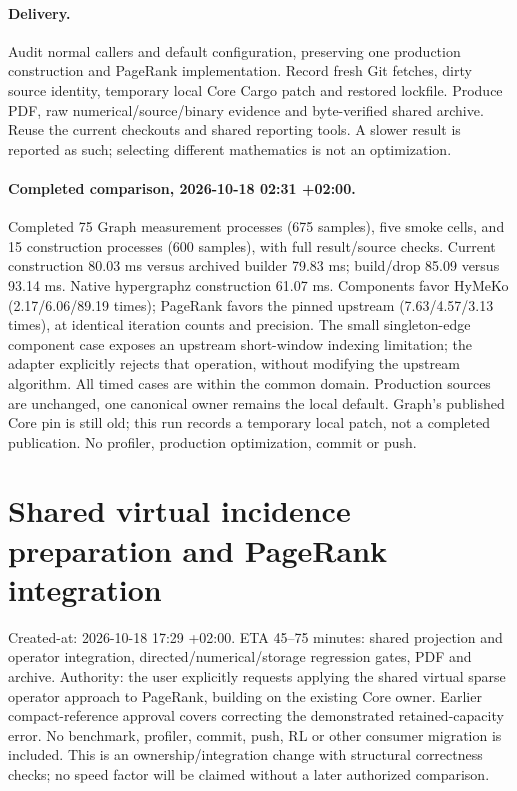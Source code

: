 \documentclass[11pt]{article}
\begin{document}
\paragraph{Delivery.} Audit normal callers and default configuration, preserving
one production construction and PageRank implementation. Record fresh Git fetches,
dirty source identity, temporary local Core Cargo patch and restored lockfile.
Produce PDF, raw numerical/source/binary evidence and byte-verified shared archive.
Reuse the current checkouts and shared reporting tools. A slower result is reported
as such; selecting different mathematics is not an optimization.


\paragraph{Completed comparison, 2026-10-18 02:31 +02:00.}
Completed 75 Graph measurement processes (675 samples), five smoke cells,
and 15 construction processes (600 samples), with full result/source checks.
Current construction 80.03 ms versus archived builder 79.83 ms; build/drop
85.09 versus 93.14 ms. Native hypergraphz construction 61.07 ms. Components
favor HyMeKo (2.17/6.06/89.19 times); PageRank favors the pinned upstream
(7.63/4.57/3.13 times), at identical iteration counts and precision.
The small singleton-edge component case exposes an upstream short-window
indexing limitation; the adapter explicitly rejects that operation, without
modifying the upstream algorithm. All timed cases are within the common domain.
Production sources are unchanged, one canonical owner remains the local default.
Graph's published Core pin is still old; this run records a temporary local patch,
not a completed publication. No profiler, production optimization, commit or push.


\newpage\section*{Shared virtual incidence preparation and PageRank integration}
Created-at: 2026-10-18 17:29 +02:00. ETA 45--75 minutes: shared projection and
operator integration, directed/numerical/storage regression gates, PDF and archive.
Authority: the user explicitly requests applying the shared virtual sparse
operator approach to PageRank, building on the existing Core owner. Earlier
compact-reference approval covers correcting the demonstrated retained-capacity
error. No benchmark, profiler, commit, push, RL or other consumer migration is
included. This is an ownership/integration change with structural correctness
checks; no speed factor will be claimed without a later authorized comparison.
\end{document}

